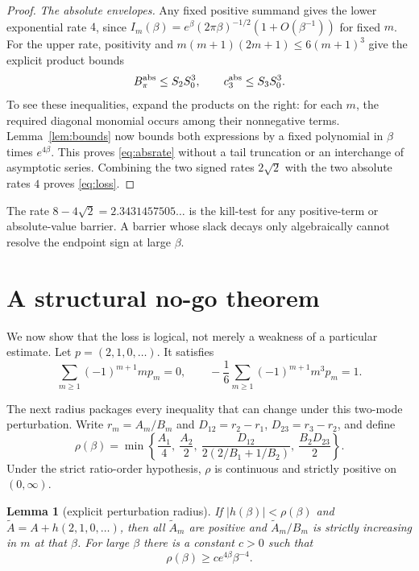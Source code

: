 \documentclass[11pt]{article}
\newtheorem{lemma}[theorem]{Lemma}
\theoremstyle{definition}
\theoremstyle{remark}
\begin{document}
\begin{proof}
\smallskip
\noindent\emph{The absolute envelopes.}
Any fixed positive summand gives the lower exponential rate $4$, since
$I_m(\beta)=e^\beta(2\pi\beta)^{-1/2}
(1+O(\beta^{-1}))$ for fixed $m$.  For the upper rate, positivity and
$m(m+1)(2m+1)\leq6(m+1)^3$ give the explicit product bounds
\begin{equation}\label{eq:envelope-products}
 B_\pi^{\rm abs}\leq S_2S_0^3,
 \qquad c_3^{\rm abs}\leq S_3S_0^3.
\end{equation}
To see these inequalities, expand the products on the right: for each
$m$, the required diagonal monomial occurs among their nonnegative terms.
Lemma~\ref{lem:bounds} now bounds both expressions by a fixed polynomial
in $\beta$ times $e^{4\beta}$.  This proves \eqref{eq:absrate} without a
tail truncation or an interchange of asymptotic series.  Combining the
two signed rates $2\sqrt2$ with the two absolute rates $4$ proves
\eqref{eq:loss}.
\end{proof}

The rate $8-4\sqrt2=2.3431457505\ldots$ is the kill-test for any
positive-term or absolute-value barrier.  A barrier whose slack decays only
algebraically cannot resolve the endpoint sign at large $\beta$.

\section{A structural no-go theorem}

We now show that the loss is logical, not merely a weakness of a particular
estimate.  Let $p=(2,1,0,\ldots)$.  It satisfies
\begin{equation}\label{eq:p}
 \sum_{m\ge1}(-1)^{m+1}mp_m=0,
 \qquad
 -\frac{1}{6}\sum_{m\ge1}(-1)^{m+1}m^3p_m=1.
\end{equation}

The next radius packages every inequality that can change under this
two-mode perturbation.  Write $r_m=A_m/B_m$ and
$D_{12}=r_2-r_1$, $D_{23}=r_3-r_2$, and define
\begin{equation}\label{eq:rho}
 \rho(\beta)=\min\left\{
 \frac{A_1}{4},\ \frac{A_2}{2},\
 \frac{D_{12}}{2(2/B_1+1/B_2)},\
 \frac{B_2D_{23}}{2}\right\}.
\end{equation}
Under the strict ratio-order hypothesis, $\rho$ is continuous and strictly
positive on $(0,\infty)$.

\begin{lemma}[explicit perturbation radius]\label{lem:rho}
If $|h(\beta)|<\rho(\beta)$ and
$\widetilde A=A+h(2,1,0,\ldots)$, then all $\widetilde A_m$ are positive
and $\widetilde A_m/B_m$ is strictly increasing in $m$ at that $\beta$.
For large $\beta$ there is a constant $c>0$ such that
\begin{equation}\label{eq:rho-large}
 \rho(\beta)\geq c e^{4\beta}\beta^{-4}.
\end{equation}
\end{lemma}
\end{document}

